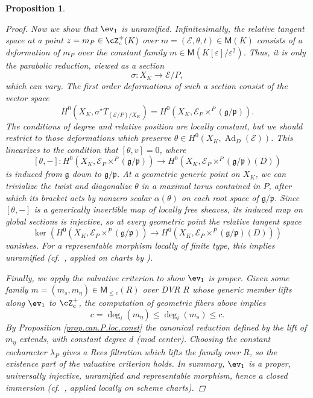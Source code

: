 \documentclass[openany]{amsbook}
\newtheorem{proposition}[theorem]{Proposition}
\theoremstyle{definition}
\theoremstyle{remark}
\numberwithin{equation}{section}
\newcommand{\cE}{\mathcal{E}}
\renewcommand{\epsilon}{\varepsilon}
\renewcommand{\-}{\operatorname{-}}
\newcommand{\on}[1]{\operatorname{#1}}
\newcommand{\bM}{\mathsf{M}}
\newcommand{\fp}{\mathfrak{p}}
\renewcommand{\fg}{\mathfrak{g}}
\newcommand{\Ad}{\on{Ad}}
\begin{document}
\begin{proposition}
\begin{proof}
        Now we show that $\ev_1$ is unramified. Infinitesimally, the relative tangent space at a point $z = m_P \in \cZ^+_c(K)$ over $m = (\cE, \theta, t) \in \bM(K)$ consists of a deformation of $m_P$ over the constant family $m \in \bM(K[\epsilon]/\epsilon^2)$. Thus, it is only the parabolic reduction, viewed as a section $$\sigma : X_K \to \cE/P,$$ which can vary. The first order deformations of such a section consist of the vector space
        $$
            H^0(X_K, \sigma^\star T_{(\cE/P)/X_K}) = H^0(X_K, \cE_P \times^P (\fg/\fp)).
        $$
        The conditions of degree and relative position are locally constant, but we should restrict to those deformations which preserve $\theta \in H^0(X_K, \Ad_D(\cE))$. This linearizes to the condition that $[\theta, v] = 0$, where
        $$
            [\theta, -] : H^0(X_K, \cE_P \times^P (\fg/\fp)) \to H^0(X_K, \cE_P \times^P (\fg/\fp)(D))
        $$
        is induced from $\fg$ down to $\fg/\fp$. At a geometric generic point on $X_K$, we can trivialize the twist and diagonalize $\theta$ in a maximal torus contained in $P$, after which its bracket acts by nonzero scalar $\alpha(\theta)$ on  each root space of $\fg/\fp$. Since $[\theta, -]$ is a generically invertible map of locally free sheaves, its induced map on global sections is injective, so at every geometric point the relative tangent space
        $$
            \ker\left(H^0(X_K, \cE_P \times^P (\fg/\fp)) \to H^0(X_K, \cE_P \times^P (\fg/\fp)(D)) \right)
        $$
        vanishes. For a representable morphism locally of finite type, this implies unramified (cf.\ \cite[Tag 0B2D, Tag 02GF]{stacks-project}, applied on charts by \cite[Tag 03ZK]{stacks-project}).

        Finally, we apply the valuative criterion to show $\ev_1$ is proper. Given some family $m = (m_s, m_\eta) \in \bM_{\le c}(R)$ over DVR $R$ whose generic member lifts along $\ev_1$ to $\cZ_c^+$, the computation of geometric fibers above implies $$c = \deg_i(m_\eta) \le \deg_i(m_s) \le c.$$
        By Proposition \ref{prop.can.P.loc.const} the canonical reduction defined by the lift of $m_\eta$ extends, with constant degree $d$ (mod center). Choosing the constant cocharacter $\lambda_P$ gives a Rees filtration which lifts the family over $R$, so the existence part of the valuative criterion holds. In summary, $\ev_1$ is a proper, universally injective, unramified and representable morphism, hence a closed immersion (cf.\ \cite[Tag 05W8]{stacks-project}, applied locally on scheme charts).
    \end{proof}
\end{proposition}
\end{document}
